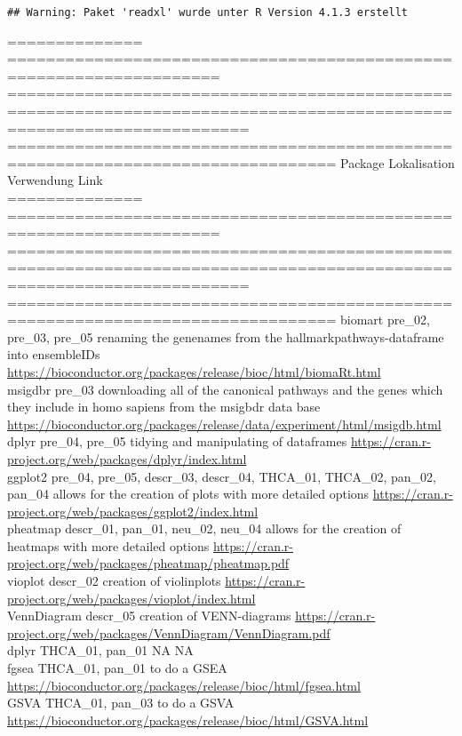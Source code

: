 \documentclass[
]{article}
\begin{document}
\begin{verbatim}
## Warning: Paket 'readxl' wurde unter R Version 4.1.3 erstellt
\end{verbatim}

==============
====================================================================
=====================================================================================================================
================================================================================
Package Lokalisation Verwendung Link\\
==============
====================================================================
=====================================================================================================================
================================================================================
biomart pre\_02, pre\_03, pre\_05 renaming the genenames from the
hallmarkpathways-dataframe into ensembleIDs
\url{https://bioconductor.org/packages/release/bioc/html/biomaRt.html}\\
msigdbr pre\_03 downloading all of the canonical pathways and the genes
which they include in homo sapiens from the msigbdr data base
\url{https://bioconductor.org/packages/release/data/experiment/html/msigdb.html}\\
dplyr pre\_04, pre\_05 tidying and manipulating of dataframes
\url{https://cran.r-project.org/web/packages/dplyr/index.html}\\
ggplot2 pre\_04, pre\_05, descr\_03, descr\_04, THCA\_01, THCA\_02,
pan\_02, pan\_04 allows for the creation of plots with more detailed
options
\url{https://cran.r-project.org/web/packages/ggplot2/index.html}\\
pheatmap descr\_01, pan\_01, neu\_02, neu\_04 allows for the creation of
heatmaps with more detailed options
\url{https://cran.r-project.org/web/packages/pheatmap/pheatmap.pdf}\\
vioplot descr\_02 creation of violinplots
\url{https://cran.r-project.org/web/packages/vioplot/index.html}\\
VennDiagram descr\_05 creation of VENN-diagrams
\url{https://cran.r-project.org/web/packages/VennDiagram/VennDiagram.pdf}\\
dplyr THCA\_01, pan\_01 NA NA\\
fgsea THCA\_01, pan\_01 to do a GSEA
\url{https://bioconductor.org/packages/release/bioc/html/fgsea.html}\\
GSVA THCA\_01, pan\_03 to do a GSVA
\url{https://bioconductor.org/packages/release/bioc/html/GSVA.html}\\
\end{document}
